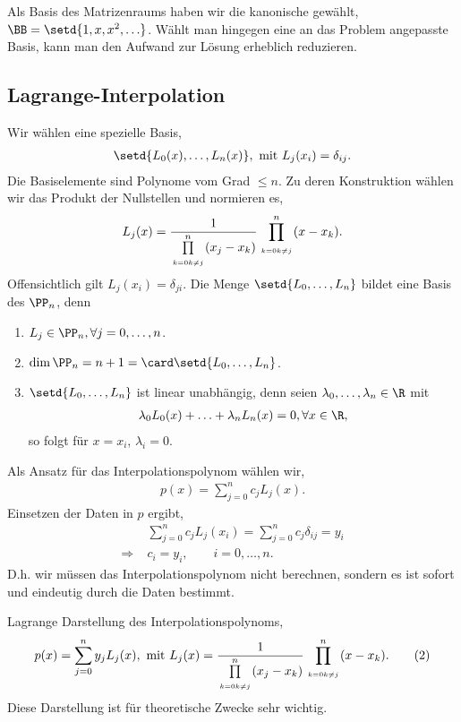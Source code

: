 Als Basis des Matrizenraums haben wir die kanonische gewählt, 
$\BB=\setd{1,x,x^2,\ldots}$. Wählt man hingegen eine an das Problem angepasste
Basis, kann man den Aufwand zur Lösung erheblich reduzieren.

\subsection{Lagrange-Interpolation}

Wir wählen eine spezielle Basis,
\begin{align*}
\setd{L_0(x),\ldots,L_n(x)},\text{ mit } L_j(x_i) = \delta_{ij}.
\end{align*}
Die Basiselemente sind Polynome vom Grad $\le n$. Zu deren 
Konstruktion wählen wir das Produkt der Nullstellen und normieren es,
\begin{align*}
L_j(x) = \frac{1}{\prod\limits_{\atop{k=0}{k\neq j}}^n (x_j-x_k)}
 \prod\limits_{\atop{k=0}{k\neq j}}^n (x-x_k).
\end{align*}
Offensichtlich gilt $L_j(x_i) = \delta_{ji}$. Die Menge
$\setd{L_0,\ldots,L_n}$ bildet eine Basis des $\PP_n$, denn
 \begin{enumerate}[label=(\roman{*})]
  \item $L_j\in\PP_n,\forall j=0,\ldots,n$.
  \item $\dim\PP_n = n+1 = \card\setd{L_0,\ldots,L_n}$.
  \item $\setd{L_0,\ldots,L_n}$ ist linear unabhängig, denn seien
  $\lambda_0,\ldots,\lambda_n\in\R$ mit
\begin{align*}
\lambda_0L_0(x) + \ldots + \lambda_nL_n(x) = 0, \forall x\in\R,
\end{align*} 
so folgt für $x=x_i$, $\lambda_i = 0$.
 \end{enumerate}
Als Ansatz für das Interpolationspolynom wählen wir,
\begin{align*}
p(x) = \sum\limits_{j=0}^n c_j L_j(x).
\end{align*}
Einsetzen der Daten in $p$ ergibt,
\begin{align*}
&\sum\limits_{j=0}^n c_j L_j(x_i) = \sum\limits_{j=0}^n c_j \delta_{ij} = y_i\\
\Rightarrow\; & c_i = y_i,\qquad i=0,\ldots,n.
\end{align*}
D.h. wir müssen das Interpolationspolynom nicht berechnen, sondern es ist
sofort und eindeutig durch die Daten bestimmt.

\begin{bemn}[Ergebnis.]
Lagrange Darstellung des Interpolationspolynoms,
\begin{align*}
p(x) = \sum\limits_{j=0}^n y_j L_j(x),\text{ mit } L_j(x) = \frac{1}{\prod\limits_{\atop{k=0}{k\neq j}}^n (x_j-x_k)}
 \prod\limits_{\atop{k=0}{k\neq j}}^n (x-x_k).\tag{2}
\end{align*}
Diese Darstellung ist für theoretische Zwecke sehr wichtig.\maphere
\end{bemn}


